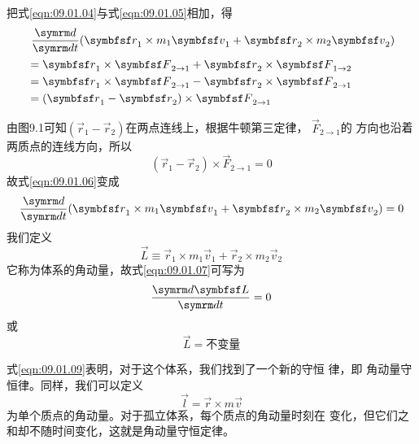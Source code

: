 把式\eqref{eqn:09.01.04}与式\eqref{eqn:09.01.05}相加，得
\begin{equation}\label{eqn:09.01.06}
  \begin{aligned}
     & ~\frac { \dif } { \dif t } ( \vec{r} _ { 1 } \times m _ { 1 } \vec{v} _ { 1 } + \vec{r} _ { 2 } \times m _ { 2 } \vec{v} _ { 2 } ) \\
     & = \vec{r} _ { 1 } \times \vec{F} _ { 2 \to 1 } + \vec{r}_ { 2 } \times \vec{F} _ { 1 \to 2 }                                       \\
     & = \vec{r} _ { 1 } \times \vec{F} _ { 2 \to 1 } - \vec{r}_ { 2 } \times \vec{F} _ { 2 \to 1 }                                       \\
     & = ( \vec{r} _ { 1 } - \vec{r} _ { 2 } ) \times \vec{F} _ { 2 \to 1 }
  \end{aligned}
\end{equation}

由图9.1可知$( \vec{r} _ { 1 } - \vec{r} _ { 2 } )$在两点连线上，根据牛顿第三定律， $\vec{F} _ { 2 \to 1 }$的
方向也沿着两质点的连线方向，所以
\begin{equation*}
  ( \vec{r} _ { 1 } - \vec{r} _ { 2 } ) \times \vec{F} _ { 2 \to 1 } = 0
\end{equation*}
故式\eqref{eqn:09.01.06}变成
\begin{equation}\label{eqn:09.01.07}
  \frac { \dif } { \dif t } ( \vec{r} _ { 1 } \times m _ { 1 } \vec{v} _ { 1 } + \vec{r} _ { 2 } \times m _ { 2 } \vec{v} _ { 2 } ) = 0
\end{equation}
我们定义
\begin{equation}\label{eqn:09.01.08}
  \vec{L} \equiv \vec{r} _ { 1 } \times m _ { 1 } \vec{v} _ { 1 } + \vec{r} _ { 2 } \times m _ { 2 } \vec{v} _ { 2 }
\end{equation}
它称为体系的角动量，故式\eqref{eqn:09.01.07}可写为
\begin{equation*}
  \frac { \dif \vec{L} } { \dif t } = 0
\end{equation*}
或
\begin{equation}\label{eqn:09.01.09}
  \vec{L}=\text{不变量}
\end{equation}

式\eqref{eqn:09.01.09}表明，对于这个体系，我们找到了一个新的守恒
律，即
角动量守恒律。同样，我们可以定义
\begin{equation}\label{eqn:09.01.10}
  \vec{l} = \vec{r} \times m \vec{v}
\end{equation}
为单个质点的角动量。对于孤立体系，每个质点的角动量时刻在
变化，但它们之和却不随时间变化，这就是角动量守恒定律。

